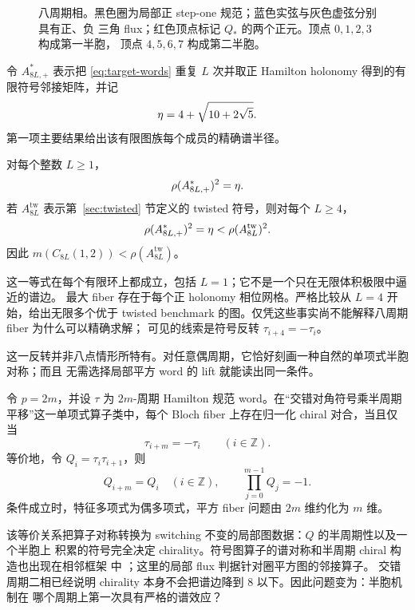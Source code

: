 \begin{figure}[t]
 \centering
 
 \caption{八周期相。黑色圈为局部正 step-one 规范；蓝色实弦与灰色虚弦分别具有正、负
 三角 flux；红色顶点标记 $Q_*$ 的两个正元。顶点 $0,1,2,3$ 构成第一半胞，
 顶点 $4,5,6,7$ 构成第二半胞。}
 \label{fig:period8-cell}
\end{figure}

令 $A_{8L,+}^{*}$ 表示把 \eqref{eq:target-words} 重复 $L$ 次并取正 Hamilton holonomy
得到的有限符号邻接矩阵，并记
\begin{equation}
 \eta=4+\sqrt{10+2\sqrt5}.
 \label{eq:eta}
\end{equation}
第一项主要结果给出该有限图族每个成员的精确谱半径。

\begin{theorem}
\label{thm:main-exact}
对每个整数 $L\geq1$，
\[
 \rho(A_{8L,+}^{*})^2=\eta.
\]
若 $A_{8L}^{\mathrm{tw}}$ 表示第~\ref{sec:twisted} 节定义的 twisted 符号，则对每个
$L\geq4$，
\[
 \rho(A_{8L,+}^{*})^2=\eta
   <\rho(A_{8L}^{\mathrm{tw}})^2.
\]
因此 $m(C_{8L}(1,2))<\rho(A_{8L}^{\mathrm{tw}})$。
\end{theorem}

这一等式在每个有限环上都成立，包括 $L=1$；它不是一个只在无限体积极限中逼近的谱边。
最大 fiber 存在于每个正 holonomy 相位网格。严格比较从 $L=4$ 开始，给出无限多个优于
twisted benchmark 的图。仅凭这些事实尚不能解释八周期 fiber 为什么可以精确求解；
可见的线索是符号反转 $\tau_{i+4}=-\tau_i$。

这一反转并非八点情形所特有。对任意偶周期，它恰好刻画一种自然的单项式半胞对称；而且
无需选择局部平方 word 的 lift 就能读出同一条件。

\begin{theorem}
\label{thm:main-chiral}
令 $p=2m$，并设 $\tau$ 为 $2m$-周期 Hamilton 规范 word。在“交错对角符号乘半周期
平移”这一单项式算子类中，每个 Bloch fiber 上存在归一化 chiral 对合，当且仅当
\[
 \tau_{i+m}=-\tau_i\qquad(i\in\mathbb Z).
\]
等价地，令 $Q_i=\tau_i\tau_{i+1}$，则
\[
 Q_{i+m}=Q_i\quad(i\in\mathbb Z),\qquad
 \prod_{j=0}^{m-1}Q_j=-1.
\]
条件成立时，特征多项式为偶多项式，平方 fiber 问题由 $2m$ 维约化为 $m$ 维。
\end{theorem}

该等价关系把算子对称转换为 switching 不变的局部图数据：$Q$ 的半周期性以及一个半胞上
积累的符号完全决定 chirality。符号图算子的谱对称和半周期 chiral 构造也出现在相邻框架
中 \cite{AtayHua2016,CedzichEtAl2021}；这里的局部 flux 判据针对圈平方图的邻接算子。
交错周期二相已经说明 chirality 本身不会把谱边降到 $8$ 以下。因此问题变为：半胞机制在
哪个周期上第一次具有严格的谱效应？

